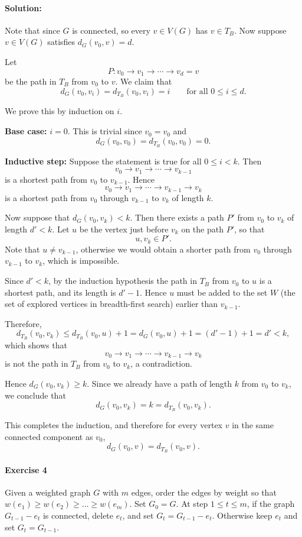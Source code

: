 \documentclass[a4paper,12pt]{article}
\begin{document}
\paragraph{Solution:} 
Note that since \(G\) is connected, so every \(v \in V(G)\) has \(v \in T_B\).   
Now suppose $v \in V(G)$ satisfies $d_G(v_0,v)=d$.

Let
\[
P: v_0 \to v_1 \to \cdots \to v_d = v
\]
be the path in $T_B$ from $v_0$ to $v$. We claim that
\[
d_G(v_0,v_i)=d_{T_B}(v_0,v_i)=i \qquad \text{for all } 0\le i\le d .
\]

We prove this by induction on $i$.

\textbf{Base case:} $i=0$. This is trivial since $v_0=v_0$ and
\[
d_G(v_0,v_0)=d_{T_B}(v_0,v_0)=0 .
\]

\textbf{Inductive step:} Suppose the statement is true for all $0\le i<k$. Then
\[
v_0 \to v_1 \to \cdots \to v_{k-1}
\]
is a shortest path from $v_0$ to $v_{k-1}$. Hence
\[
v_0 \to v_1 \to \cdots \to v_{k-1} \to v_k
\]
is a shortest path from $v_0$ through \(v_{k-1}\) to $v_k$ of length $k$.

Now suppose that $d_G(v_0,v_k)<k$. Then there exists a path $P'$ from $v_0$ to $v_k$ of length $d'<k$. Let $u$ be the vertex just before $v_k$ on the path $P'$, so that
\[
{u,v_k}\in P'.
\]
Note that $u\ne v_{k-1}$, otherwise we would obtain a shorter path from $v_0$ through $v_{k-1}$ to $v_k$, which is impossible.

Since $d'<k$, by the induction hypothesis the path in $T_B$ from $v_0$ to $u$ is a shortest path, and its length is $d'-1$. Hence $u$ must be added to the set $W$ (the set of explored vertices in breadth-first search) earlier than $v_{k-1}$.

Therefore,
\[
d_{T_B}(v_0,v_k) \le d_{T_B}(v_0,u)+1=d_G(v_0,u)+1=(d'-1)+1=d'<k,
\]
which shows that
\[
v_0 \to v_1 \to \cdots \to v_{k-1} \to v_k
\]
is not the path in $T_B$ from $v_0$ to $v_k$, a contradiction.

Hence $d_G(v_0,v_k)\ge k$. Since we already have a path of length $k$ from $v_0$ to $v_k$, we conclude that
\[
d_G(v_0,v_k)=k=d_{T_B}(v_0,v_k).
\]

This completes the induction, and therefore for every vertex $v$ in the same connected component as $v_0$,
\[
d_G(v_0,v)=d_{T_B}(v_0,v).
\]



\paragraph{Exercise 4}  Given a weighted graph $G$ with $m$ edges, order the edges by weight so that $w(e_1) \ge w(e_2) \ge \hdots \ge w(e_m)$.  Set $G_0 = G$.  At step $1 \le t \le m$, if the graph $G_{t-1} - e_t$ is connected, delete $e_t$, and set $G_t = G_{t-1} - e_t$.  Otherwise keep $e_t$ and set $G_t = G_{t-1}$.
\end{document}
